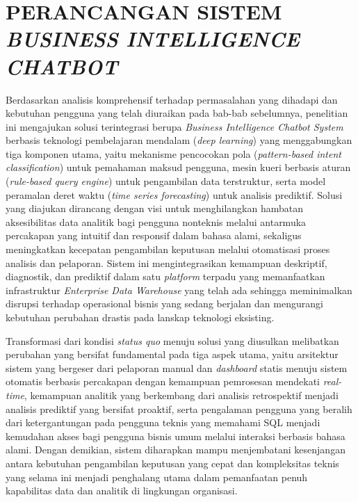\cleardoublepage
\chapter{PERANCANGAN SISTEM \textit{BUSINESS INTELLIGENCE CHATBOT}}
\label{chap:perancangan}

Berdasarkan analisis komprehensif terhadap permasalahan yang dihadapi dan kebutuhan pengguna yang telah diuraikan pada bab-bab sebelumnya, penelitian ini mengajukan solusi terintegrasi berupa \textit{Business Intelligence Chatbot System} berbasis teknologi pembelajaran mendalam (\textit{deep learning}) yang menggabungkan tiga komponen utama, yaitu mekanisme pencocokan pola (\textit{pattern-based intent classification}) untuk pemahaman maksud pengguna, mesin kueri berbasis aturan (\textit{rule-based query engine}) untuk pengambilan data terstruktur, serta model peramalan deret waktu (\textit{time series forecasting}) untuk analisis prediktif. Solusi yang diajukan dirancang dengan visi untuk menghilangkan hambatan aksesibilitas data analitik bagi pengguna nonteknis melalui antarmuka percakapan yang intuitif dan responsif dalam bahasa alami, sekaligus meningkatkan kecepatan pengambilan keputusan melalui otomatisasi proses analisis dan pelaporan. Sistem ini mengintegrasikan kemampuan deskriptif, diagnostik, dan prediktif dalam satu \textit{platform} terpadu yang memanfaatkan infrastruktur \textit{Enterprise Data Warehouse} yang telah ada sehingga meminimalkan disrupsi terhadap operasional bisnis yang sedang berjalan dan mengurangi kebutuhan perubahan drastis pada lanskap teknologi eksisting.

Transformasi dari kondisi \textit{status quo} menuju solusi yang diusulkan melibatkan perubahan yang bersifat fundamental pada tiga aspek utama, yaitu arsitektur sistem yang bergeser dari pelaporan manual dan \textit{dashboard} statis menuju sistem otomatis berbasis percakapan dengan kemampuan pemrosesan mendekati \textit{real-time}, kemampuan analitik yang berkembang dari analisis retrospektif menjadi analisis prediktif yang bersifat proaktif, serta pengalaman pengguna yang beralih dari ketergantungan pada pengguna teknis yang memahami SQL menjadi kemudahan akses bagi pengguna bisnis umum melalui interaksi berbasis bahasa alami. Dengan demikian, sistem diharapkan mampu menjembatani kesenjangan antara kebutuhan pengambilan keputusan yang cepat dan kompleksitas teknis yang selama ini menjadi penghalang utama dalam pemanfaatan penuh kapabilitas data dan analitik di lingkungan organisasi.

